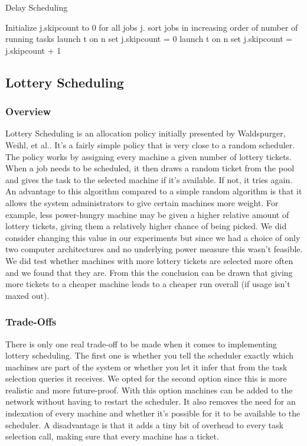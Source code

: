 \documentclass{article}
\begin{document}
\begin{algorithm}
\caption{Delay Scheduling}\label{delay-scheduling-algorithm}
\begin{algorithmic}[1]
\State Initialize j.skipcount to 0 for all jobs j.
\State sort jobs in increasing order of number of running tasks
\State launch t on n
\State set j.skipcount = 0
\State launch t on n
\Else
\State set j.skipcount = j.skipcount + 1
\EndIf
\EndIf
\EndFor
\EndIf
\end{algorithmic}
\end{algorithm}

\subsection{Lottery Scheduling}
\subsubsection{Overview}
Lottery Scheduling is an allocation policy initially presented by Waldspurger, Weihl, et al.\cite{waldspurger1994lottery}. It's a fairly simple policy that is very close to a random scheduler. The policy works by assigning every machine a given number of lottery tickets. When a job needs to be scheduled, it then draws a random ticket from the pool and gives the task to the selected machine if it's available. If not, it tries again. An advantage to this algorithm compared to a simple random algorithm is that it allows the system administrators to give certain machines more weight. For example, less power-hungry machine may be given a higher relative amount of lottery tickets, giving them a relatively higher chance of being picked. We did consider changing this value in our experiments but since we had a choice of only two computer architectures and no underlying power measure this wasn't feasible. We did test whether machines with more lottery tickets are selected more often and we found that they are. From this the conclusion can be drawn that giving more tickets to a cheaper machine leads to a cheaper run overall (if usage isn't maxed out).
\subsubsection{Trade-Offs}
There is only one real trade-off to be made when it comes to implementing lottery scheduling. The first one is whether you tell the scheduler exactly which machines are part of the system or whether you let it infer that from the task selection queries it receives. We opted for the second option since this is more realistic and more future-proof. With this option machines can be added to the network without having to restart the scheduler. It also removes the need for an indexation of every machine and whether it's possible for it to be available to the scheduler. A disadvantage is that it adds a tiny bit of overhead to every task selection call, making sure that every machine has a ticket. 
\end{document}
